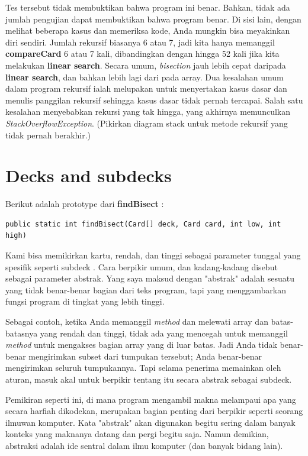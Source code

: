 \documentclass[12pt,b5paper,openright,twoside]{book}
\begin{document}
\noindent Tes tersebut tidak membuktikan bahwa program ini benar. Bahkan, tidak ada jumlah pengujian dapat membuktikan bahwa program benar. Di sisi lain, dengan melihat beberapa kasus dan memeriksa kode, Anda mungkin bisa meyakinkan diri sendiri.
Jumlah rekursif biasanya 6 atau 7, jadi kita hanya memanggil \textbf{compareCard} 6 atau 7 kali, dibandingkan dengan hingga 52 kali jika kita melakukan \textbf{linear search}. Secara umum, \textit{bisection} jauh lebih cepat daripada \textbf{linear search}, dan bahkan lebih lagi dari pada array.
Dua kesalahan umum dalam program rekursif ialah melupakan untuk menyertakan kasus dasar dan menulis panggilan rekursif sehingga kasus dasar tidak pernah tercapai. 
Salah satu kesalahan menyebabkan rekursi yang tak hingga, yang akhirnya memunculkan \textit{StackOverflowException}. (Pikirkan diagram stack untuk metode rekursif yang tidak pernah berakhir.)

\section{Decks and subdecks}
Berikut adalah prototype dari \textbf{findBisect} :
\begin{lstlisting}
public static int findBisect(Card[] deck, Card card, int low, int high)
\end{lstlisting}

\noindent Kami bisa memikirkan kartu, rendah, dan tinggi sebagai parameter tunggal yang spesifik seperti subdeck . Cara berpikir umum, dan kadang-kadang disebut sebagai parameter abstrak. Yang saya maksud dengan "abstrak" adalah sesuatu yang tidak benar-benar bagian dari teks program, tapi yang menggambarkan fungsi program di tingkat yang lebih tinggi.

\noindent Sebagai contoh, ketika Anda memanggil \textit{method} dan melewati array dan batas-batasnya yang rendah dan tinggi, tidak ada yang mencegah untuk memanggil \textit{method} untuk mengakses bagian array yang di luar batas. Jadi Anda tidak benar-benar mengirimkan subset dari tumpukan tersebut; Anda benar-benar mengirimkan seluruh tumpukannya. Tapi selama penerima memainkan oleh aturan, masuk akal untuk berpikir tentang itu secara abstrak sebagai subdeck.

\noindent Pemikiran seperti ini, di mana program mengambil makna melampaui apa yang secara harfiah dikodekan, merupakan bagian penting dari berpikir seperti seorang ilmuwan komputer. Kata "abstrak" akan digunakan begitu sering dalam banyak konteks yang maknanya datang dan pergi begitu saja. Namun demikian, abstraksi adalah ide sentral dalam ilmu komputer (dan banyak bidang lain).
\end{document}
